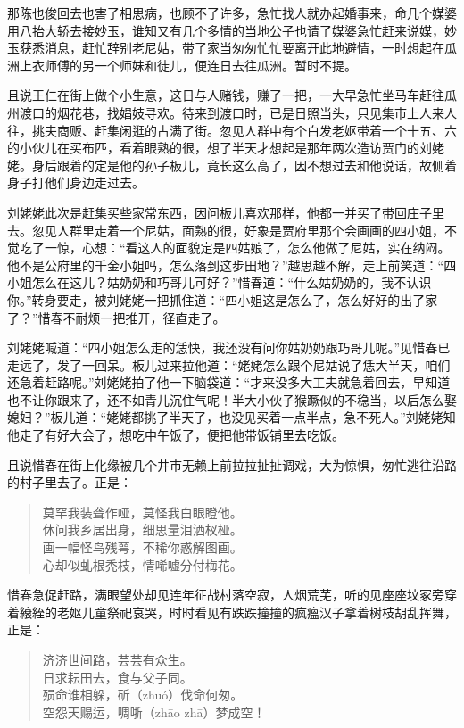 \documentclass[12pt,oneside]{book}
\newenvironment{shici}{%
\begin{verse}%
\centering\large\hspace{12pt}}%
{\end{verse}}
\begin{document}
那陈也俊回去也害了相思病，也顾不了许多，急忙找人就办起婚事来，命几个媒婆用八抬大轿去接妙玉，谁知又有几个多情的当地公子也请了媒婆急忙赶来说媒，妙玉获悉消息，赶忙辞别老尼姑，带了家当匆匆忙忙要离开此地避情，一时想起在瓜洲上衣师傅的另一个师妹和徒儿，便连日去往瓜洲。暂时不提。

且说王仁在街上做个小生意，这日与人赌钱，赚了一把，一大早急忙坐马车赶往瓜州渡口的烟花巷，找娼妓寻欢。待来到渡口时，已是日照当头，只见集市上人来人往，挑夫商贩、赶集闲逛的占满了街。忽见人群中有个白发老妪带着一个十五、六的小伙儿在买布匹，看着眼熟的很，想了半天才想起是那年两次造访贾门的刘姥姥。身后跟着的定是他的孙子板儿，竟长这么高了，因不想过去和他说话，故侧着身子打他们身边走过去。

刘姥姥此次是赶集买些家常东西，因问板儿喜欢那样，他都一并买了带回庄子里去。忽见人群里走着一个尼姑，面熟的很，好象是贾府里那个会画画的四小姐，不觉吃了一惊，心想：“看这人的面貌定是四姑娘了，怎么他做了尼姑，实在纳闷。他不是公府里的千金小姐吗，怎么落到这步田地？”越思越不解，走上前笑道：“四小姐怎么在这儿？姑奶奶和巧哥儿可好？”惜春道：“什么姑奶奶的，我不认识你。”转身要走，被刘姥姥一把抓住道：“四小姐这是怎么了，怎么好好的出了家了？”惜春不耐烦一把推开，径直走了。

刘姥姥喊道：“四小姐怎么走的恁快，我还没有问你姑奶奶跟巧哥儿呢。”见惜春已走远了，发了一回呆。板儿过来拉他道：“姥姥怎么跟个尼姑说了恁大半天，咱们还急着赶路呢。”刘姥姥拍了他一下脑袋道：“才来没多大工夫就急着回去，早知道也不让你跟来了，还不如青儿沉住气呢！半大小伙子猴蹶似的不稳当，以后怎么娶媳妇？”板儿道：“姥姥都挑了半天了，也没见买着一点半点，急不死人。”刘姥姥知他走了有好大会了，想吃中午饭了，便把他带饭铺里去吃饭。

且说惜春在街上化缘被几个井市无赖上前拉拉扯扯调戏，大为惊惧，匆忙逃往沿路的村子里去了。正是：

\begin{shici}
莫罕我装聋作哑，莫怪我白眼瞪他。\\
休问我乡居出身，细思量泪洒杈桠。\\
画一幅怪鸟残萼，不稀你惑解图画。\\
心却似虬根秃枝，情唏嘘分付梅花。
\end{shici}

惜春急促赶路，满眼望处却见连年征战村落空寂，人烟荒芜，听的见座座坟冢旁穿着縗絰的老妪儿童祭祀哀哭，时时看见有跌跌撞撞的疯瘟汉子拿着树枝胡乱挥舞，正是：

\begin{shici}
济济世间路，芸芸有众生。\\
日求耘田去，食与父子同。\\
殒命谁相躲，斫（zhuó）伐命何匆。\\
空怨天赐运，啁哳（zhāo zhā）梦成空！
\end{shici}
\end{document}
